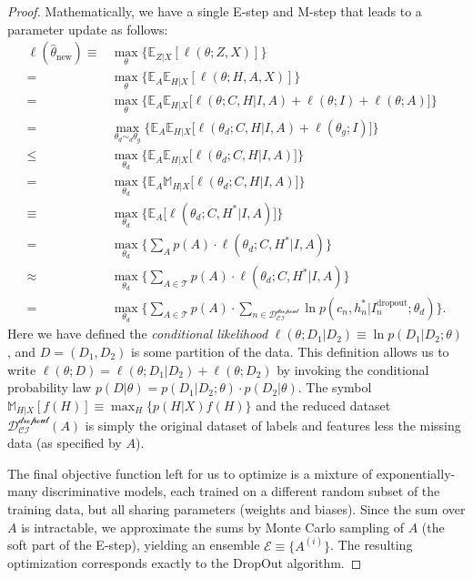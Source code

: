 \documentclass[12pt]{article}
\newcommand{\Expect}[0]{{ \mathbb{E} }}
\newcommand{\MaxExp}[0]{{ \mathbb{M} }}
\begin{document}
\begin{proof}
Mathematically, we have a single E-step and M-step that leads to a parameter update as follows:
\begin{align*} 
   \ell(\hat{\theta}_{\textrm{new}}) \equiv& \max_{\theta} \Big\{ \Expect_{Z|X}[ \ell(\theta;Z,X) ]   \Big\}     \\
                     =& \max_{\theta} \Big\{ \Expect_{A} \Expect_{H|X}[ \ell(\theta;H,A,X) ]   \Big\}     \\
                     =& \max_{\theta} \Big\{ \Expect_{A} \Expect_{H|X}\Big[ \ell(\theta;C,H | I,A) + \ell(\theta;I) + \ell(\theta;A) \Big]   \Big\}     \\
                     =& \max_{\theta_{d} \sim_{d} \theta_{g}} \Big\{ \Expect_{A} \Expect_{H|X}\Big[ \ell(\theta_{d};C,H | I,A) + \ell(\theta_{g};I) \Big]   \Big\}     \\
                     \leq& \max_{\theta_{d}} \Big\{ \Expect_{A} \Expect_{H|X}\Big[ \ell(\theta_{d};C,H | I,A) \Big]   \Big\}     \\
                     =& \max_{\theta_{d}} \Big\{ \Expect_{A} \MaxExp_{H|X}\Big[ \ell(\theta_{d};C,H | I,A) \Big]   \Big\}     \\
                     \equiv& \max_{\theta_{d}} \Big\{ \Expect_{A} \Big[ \ell(\theta_{d};C,H^{*} | I,A) \Big]   \Big\}     \\
                     =& \max_{\theta_{d}} \Big\{ \sum_{A} p(A) \cdot \ell(\theta_{d};C,H^{*} | I,A)  \Big\}     \\
                     \approx& \max_{\theta_{d}} \Big\{ \sum_{A\in \mathcal{T}} p(A) \cdot \ell(\theta_{d};C,H^{*} | I,A)  \Big\}     \\
                     =& \max_{\theta_{d}} \Big\{ \sum_{A \in \mathcal{T}} p(A) \cdot \sum_{n \in \mathcal{D_{CI}^{\textrm{dropout}}}}\ln p(c_{n}, h_{n}^{*} | I_{n}^{\textrm{dropout}}; \theta_{d})  \Big\} .
\end{align*}
Here we have defined the \emph{conditional likelihood} $\ell(\theta; D_{1} | D_{2}) \equiv \ln p(D_{1} | D_{2}; \theta)$, and $D= (D_{1}, D_{2})$ is some partition of the data. This definition allows us to write $\ell(\theta; D) = \ell(\theta; D_{1} | D_{2}) + \ell(\theta; D_{2})$ by invoking the conditional probability law $p(D | \theta) = p(D_{1} | D_{2} ; \theta) \cdot p(D_{2} | \theta)$. The symbol $\MaxExp_{H|X}[f(H)] \equiv \max_{H} \{ p(H|X) f(H) \}$ and the reduced dataset $\mathcal{D_{CI}^{\textrm{dropout}}}(A)$ is simply the original dataset of labels and features less the missing data (as specified by $A$).

The final objective function left for us to optimize is a mixture of exponentially-many discriminative models, each trained on a different random subset of the training data, but all sharing parameters (weights and biases). Since the sum over $A$ is intractable, we approximate the sums by Monte Carlo sampling of $A$ (the soft part of the E-step), yielding an ensemble $\mathcal{E} \equiv \{ A^{(i)} \}$. The resulting optimization corresponds exactly to the DropOut algorithm.
\end{proof}

\clearpage




\end{document}
